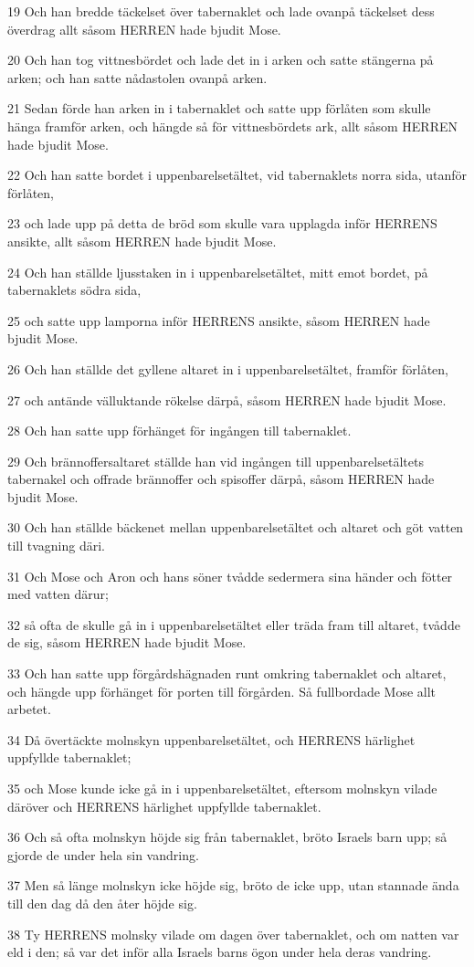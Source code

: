 \par 19 Och han bredde täckelset över tabernaklet och lade ovanpå täckelset dess överdrag allt såsom HERREN hade bjudit Mose.
\par 20 Och han tog vittnesbördet och lade det in i arken och satte stängerna på arken; och han satte nådastolen ovanpå arken.
\par 21 Sedan förde han arken in i tabernaklet och satte upp förlåten som skulle hänga framför arken, och hängde så för vittnesbördets ark, allt såsom HERREN hade bjudit Mose.
\par 22 Och han satte bordet i uppenbarelsetältet, vid tabernaklets norra sida, utanför förlåten,
\par 23 och lade upp på detta de bröd som skulle vara upplagda inför HERRENS ansikte, allt såsom HERREN hade bjudit Mose.
\par 24 Och han ställde ljusstaken in i uppenbarelsetältet, mitt emot bordet, på tabernaklets södra sida,
\par 25 och satte upp lamporna inför HERRENS ansikte, såsom HERREN hade bjudit Mose.
\par 26 Och han ställde det gyllene altaret in i uppenbarelsetältet, framför förlåten,
\par 27 och antände välluktande rökelse därpå, såsom HERREN hade bjudit Mose.
\par 28 Och han satte upp förhänget för ingången till tabernaklet.
\par 29 Och brännoffersaltaret ställde han vid ingången till uppenbarelsetältets tabernakel och offrade brännoffer och spisoffer därpå, såsom HERREN hade bjudit Mose.
\par 30 Och han ställde bäckenet mellan uppenbarelsetältet och altaret och göt vatten till tvagning däri.
\par 31 Och Mose och Aron och hans söner tvådde sedermera sina händer och fötter med vatten därur;
\par 32 så ofta de skulle gå in i uppenbarelsetältet eller träda fram till altaret, tvådde de sig, såsom HERREN hade bjudit Mose.
\par 33 Och han satte upp förgårdshägnaden runt omkring tabernaklet och altaret, och hängde upp förhänget för porten till förgården. Så fullbordade Mose allt arbetet.
\par 34 Då övertäckte molnskyn uppenbarelsetältet, och HERRENS härlighet uppfyllde tabernaklet;
\par 35 och Mose kunde icke gå in i uppenbarelsetältet, eftersom molnskyn vilade däröver och HERRENS härlighet uppfyllde tabernaklet.
\par 36 Och så ofta molnskyn höjde sig från tabernaklet, bröto Israels barn upp; så gjorde de under hela sin vandring.
\par 37 Men så länge molnskyn icke höjde sig, bröto de icke upp, utan stannade ända till den dag då den åter höjde sig.
\par 38 Ty HERRENS molnsky vilade om dagen över tabernaklet, och om natten var eld i den; så var det inför alla Israels barns ögon under hela deras vandring.


